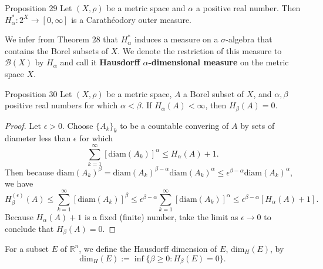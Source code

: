 \begin{namedthm*}{Proposition 29}
    Let $(X,\rho)$ be a metric space and $\alpha$ a positive real number.
    Then $H_\alpha^*:2^X\to[0,\infty]$ is a Carath\'eodory outer measure.
\end{namedthm*}
We infer from Theorem 28 that $H_\alpha^*$ induces a measure on a $\sigma$-algebra that contains the Borel subsets of $X$.
We denote the restriction of this measure to $\mathcal{B}(X)$ by $H_\alpha$ and call it \textbf{Hausdorff $\alpha$-dimensional measure} on the metric space $X$.

\begin{namedthm*}{Proposition 30}   
    Let $(X,\rho)$ be a metric space, $A$ a Borel subset of $X$, and $\alpha,\beta$ positive real numbers for which $\alpha<\beta$.
    If $H_\alpha(A)<\infty$, then $H_\beta(A)=0$.
\end{namedthm*}
\begin{proof}
    Let $\epsilon>0$.
    Choose $\{A_k\}_k$ to be a countable convering of $A$ by sets of diameter less than $\epsilon$ for which 
    \[
        \sum_{k=1}^\infty[\text{diam}(A_k)]^\alpha\le H_\alpha(A)+1.
    \] 
    Then because $\text{diam}(A_k)^\beta=\text{diam}(A_k)^{\beta-\alpha}\text{diam}(A_k)^\alpha\le\epsilon^{\beta-\alpha}\text{diam}(A_k)^\alpha$, we have
    \[
        H_\beta^{(\epsilon)}(A)\le\sum_{k=1}^\infty[\text{diam}(A_k)]^\beta\le\epsilon^{\beta-\alpha}\sum_{k=1}^\infty[\text{diam}(A_k)]^\alpha
        \le\epsilon^{\beta-\alpha}[H_\alpha(A)+1].
    \]
    Because $H_\alpha(A)+1$ is a fixed (finite) number, take the limit as $\epsilon\to0$ to conclude that $H_\beta(A)=0$.
\end{proof}
For a subset $E$ of $\mathbb{R}^n$, we define the Hausdorff dimension of $E$, $\text{dim}_H(E)$, by
\[
    \text{dim}_H(E):=\inf\{\beta\ge0:H_\beta(E)=0\}.
\]  

